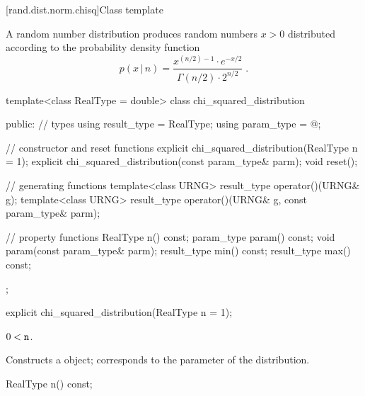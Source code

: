 
[rand.dist.norm.chisq]{Class template }%
%

\pnum
A  random number distribution
produces random numbers $x>0$
distributed according to
the probability density function%
%
\[%
 p(x\,|\,n)
      =  \frac{ x^{(n/2)-1} \cdot e^{-x/2}}
              {\Gamma(n/2) \cdot 2^{n/2}}
\; \mbox{.}
\]

\begin{codeblock}
template<class RealType = double>
 class chi_squared_distribution
{
public:
 // types
 using result_type = RealType;
 using param_type  = @\unspec@;

 // constructor and reset functions
 explicit chi_squared_distribution(RealType n = 1);
 explicit chi_squared_distribution(const param_type& parm);
 void reset();

 // generating functions
 template<class URNG>
   result_type operator()(URNG& g);
 template<class URNG>
   result_type operator()(URNG& g, const param_type& parm);

 // property functions
 RealType n() const;
 param_type param() const;
 void param(const param_type& parm);
 result_type min() const;
 result_type max() const;
};
\end{codeblock}


%
\begin{itemdecl}
explicit chi_squared_distribution(RealType n = 1);
\end{itemdecl}

\begin{itemdescr}
\pnum\requires
 $ 0 < \texttt{n} $.

\pnum\effects Constructs a  object;
 corresponds to the parameter of the distribution.
\end{itemdescr}

%
%
\begin{itemdecl}
RealType n() const;
\end{itemdecl}


